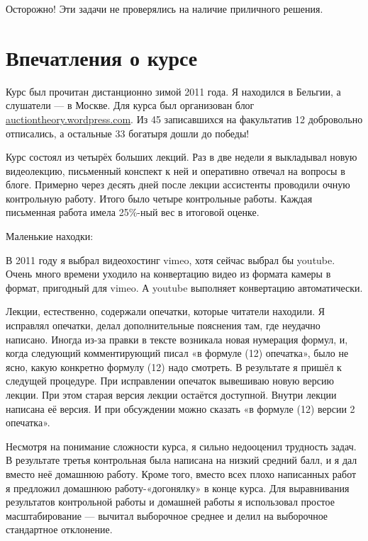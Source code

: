 \documentclass[11pt, openany]{book}
\numberwithin{equation}{page} %
\theoremstyle{definition} %
\theoremstyle{definition}
\theoremstyle{definition}
\begin{document}
Осторожно! Эти задачи не проверялись на наличие приличного решения.




\chapter*{Впечатления о курсе}

Курс был прочитан дистанционно зимой 2011 года. Я находился в Бельгии, а слушатели — в Москве. Для курса был организован блог \url{auctiontheory.wordpress.com}. Из 45 записавшихся на факультатив 12 добровольно отписались, а остальные 33 богатыря дошли до победы!

Курс состоял из четырёх больших лекций. Раз в две недели я выкладывал новую видеолекцию, письменный конспект к ней и оперативно отвечал на вопросы в блоге. Примерно через десять дней после лекции ассистенты проводили очную контрольную работу. Итого было четыре контрольные работы. Каждая письменная работа имела 25\%-ный вес в итоговой оценке.

Маленькие находки:

В 2011 году я выбрал видеохостинг vimeo, хотя сейчас выбрал бы youtube. Очень много времени уходило на конвертацию видео из формата камеры в формат, пригодный для vimeo. А youtube выполняет конвертацию автоматически.

Лекции, естественно, содержали опечатки, которые читатели находили. Я исправлял опечатки, делал дополнительные пояснения там, где неудачно написано. Иногда из-за правки в тексте возникала новая нумерация формул, и, когда следующий комментирующий писал «в формуле (12) опечатка», было не ясно, какую конкретно формулу (12) надо смотреть. В результате я пришёл к следущей процедуре. При исправлении опечаток вывешиваю новую версию лекции. При этом старая версия лекции остаётся доступной. Внутри лекции написана её версия. И при обсуждении можно сказать «в формуле (12) версии 2 опечатка».

Несмотря на понимание сложности курса, я сильно недооценил трудность задач. В результате третья контрольная была написана на низкий средний балл, и я дал вместо неё домашнюю работу. Кроме того, вместо всех плохо написанных работ я предложил домашнюю работу-«догонялку» в конце курса. Для выравнивания результатов контрольной работы и домашней работы я использовал простое масштабирование — вычитал выборочное среднее и делил на выборочное стандартное отклонение.
\end{document}
